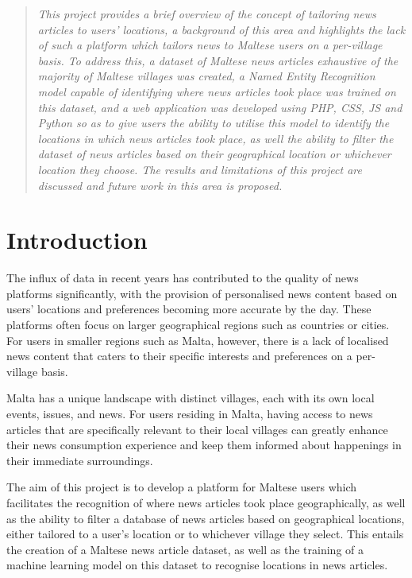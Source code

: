 \documentclass[a4paper, oneside, 11pt]{article}
\begin{document}
\begin{multicols*}{2}

  \begin{abstract}
    \textit{
      This project provides a brief overview of the concept of tailoring news articles to users' locations, a background of this area and highlights the lack of such a platform which tailors news to Maltese users on a per-village basis. To address this, a dataset of Maltese news articles exhaustive of the majority of Maltese villages was created, a Named Entity Recognition model capable of identifying where news articles took place was trained on this dataset, and a web application was developed using PHP, CSS, JS and Python so as to give users the ability to utilise this model to identify the locations in which news articles took place, as well the ability to filter the dataset of news articles based on their geographical location or whichever location they choose. The results and limitations of this project are discussed and future work in this area is proposed.
    }
  \end{abstract}


  \section{Introduction}

  The influx of data in recent years has contributed to the quality of news platforms significantly, with the provision of personalised news content based on users' locations and preferences becoming more accurate by the day. These platforms often focus on larger geographical regions such as countries or cities. For users in smaller regions such as Malta, however, there is a lack of localised news content that caters to their specific interests and preferences on a per-village basis.

  Malta has a unique landscape with distinct villages, each with its own local events, issues, and news. For users residing in Malta, having access to news articles that are specifically relevant to their local villages can greatly enhance their news consumption experience and keep them informed about happenings in their immediate surroundings.

  The aim of this project is to develop a platform for Maltese users which facilitates the recognition of where news articles took place geographically, as well as the ability to filter a database of news articles based on geographical locations, either tailored to a user's location or to whichever village they select. This entails the creation of a Maltese news article dataset, as well as the training of a machine learning model on this dataset to recognise locations in news articles.


\end{multicols*}
\end{document}
